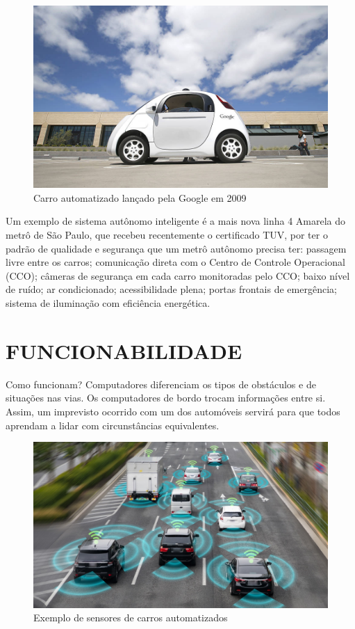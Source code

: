 \documentclass[a4paper, 12pt]{article}
\begin{document}
      \begin{figure}[htb]
        \centering
        \includegraphics[scale=0.5]{0002.png}
        \caption{Carro automatizado lançado pela Google em 2009}
        \label{fig:my_label}
    \end{figure}
    
    Um exemplo de sistema autônomo inteligente é a mais nova linha 4 Amarela do metrô de São Paulo, que recebeu recentemente o certificado TUV, por ter o padrão de qualidade e segurança que um metrô autônomo precisa ter: passagem livre entre os carros; comunicação direta com o Centro de Controle Operacional (CCO); câmeras de segurança em cada carro monitoradas pelo CCO; baixo nível de ruído; ar condicionado; acessibilidade plena; portas frontais de emergência; sistema de iluminação com eficiência energética.
 \newpage
\section{FUNCIONABILIDADE}

    Como funcionam? Computadores diferenciam os tipos de obstáculos e de situações nas vias. Os computadores de bordo trocam informações entre si. Assim, um imprevisto ocorrido com um dos automóveis servirá para que todos aprendam a lidar com circunstâncias equivalentes. 
    
        \begin{figure}[htb]
        \centering
        \includegraphics[scale=0.5]{0003.png}
        \caption{Exemplo de sensores de carros automatizados}
        \label{fig:my_label}
    \end{figure}
    
\end{document}
